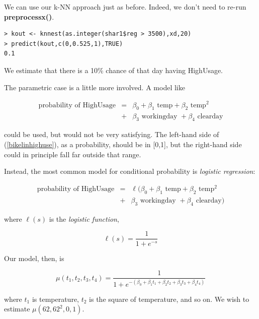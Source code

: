 We can use our k-NN approach just as before.  Indeed, we don't need to
re-run {\bf preprocessx()}.

\begin{lstlisting}
> kout <- knnest(as.integer(shar1$reg > 3500),xd,20)
> predict(kout,c(0,0.525,1),TRUE)
0.1 
\end{lstlisting}

We estimate that there is a 10\% chance of that day having HighUsage.

The parametric case is a little more involved.  A model like

\begin{eqnarray}
\textrm{probability of HighUsage} 
&=& 
\beta_0 + 
\beta_1 \textrm{ temp} + 
\beta_2 \textrm{ temp}^2 \nonumber \\
&+& 
\beta_3 \textrm{ workingday } +
\beta_4 \textrm{ clearday} 
\label{bikelinhighuse}
\end{eqnarray}

could be used, but would not be very satisfying.  The left-hand side of
(\ref{bikelinhighuse}), as a probability, should be in [0,1], but the
right-hand side could in principle fall far outside that range.

Instead, the most common model for conditional probability is {\it
logistic regression}:

\begin{eqnarray}
\textrm{probability of HighUsage} 
&=& 
\ell (
\beta_0 + 
\beta_1 \textrm{ temp} + 
\beta_2 \textrm{ temp}^2 \nonumber \\
&+& 
\beta_3 \textrm{ workingday } +
\beta_4 \textrm{ clearday} 
)
\label{logithighusage}
\end{eqnarray}

where $\ell(s)$ is the {\it logistic function},

\begin{equation}
\label{logitfun}
\ell(s) =
\frac{1}{1+e^{-s}}
\end{equation}

Our model, then, is

\begin{equation}
\mu(t_1,t_2,t_3,t_4) =
\frac{1}
{1+e^{-
   (
   \beta_0 +
   \beta_1 t_1 +
   \beta_2 t_2 +
   \beta_3 t_3 +
   \beta_4 t_4 
   )
   }
}
\end{equation}

where $t_1$ is temperature, $t_2$ is the square of temperature, and so
on.  We wish to estimate $\mu(62,62^2,0,1)$.

